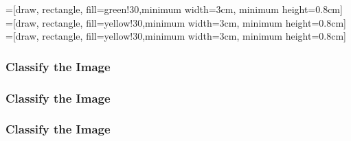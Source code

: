 =[draw, rectangle, fill=green!30,minimum width=3cm, minimum height=0.8cm]
=[draw, rectangle, fill=yellow!30,minimum width=3cm, minimum height=0.8cm]
=[draw, rectangle, fill=yellow!30,minimum width=3cm, minimum height=0.8cm]

\begin{frame}
\frametitle<1-2>{Classify the Image}
\frametitle<3-4>{Classify the Image}
\frametitle<5->{Classify the Image}
\centering
{}
\end{frame}
